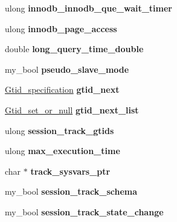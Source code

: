 \begin{DoxyCompactItemize}
ulong {\bfseries innodb\+\_\+innodb\+\_\+que\+\_\+wait\+\_\+timer}
\item 
\mbox{\label{structsystem__variables_acfb8ca70ec7a33d5a16a046352e88d9c}} 
ulong {\bfseries innodb\+\_\+page\+\_\+access}
\item 
\mbox{\label{structsystem__variables_a4bb6e4a7a5c246734dd67d04120ad000}} 
double {\bfseries long\+\_\+query\+\_\+time\+\_\+double}
\item 
\mbox{\label{structsystem__variables_a91daacd61c8a1ed9bed34a5027617157}} 
my\+\_\+bool {\bfseries pseudo\+\_\+slave\+\_\+mode}
\item 
\mbox{\label{structsystem__variables_a01851766aa96491946153ecd06eb7519}} 
\mbox{\hyperlink{structGtid__specification}{Gtid\+\_\+specification}} {\bfseries gtid\+\_\+next}
\item 
\mbox{\label{structsystem__variables_a610745f76fcd2fd2a2e0c170b73a136d}} 
\mbox{\hyperlink{structGtid__set__or__null}{Gtid\+\_\+set\+\_\+or\+\_\+null}} {\bfseries gtid\+\_\+next\+\_\+list}
\item 
\mbox{\label{structsystem__variables_a76cef237cfcd4a249f41108d70911aa1}} 
ulong {\bfseries session\+\_\+track\+\_\+gtids}
\item 
\mbox{\label{structsystem__variables_a1213f04e085d97ce09e3f217f9c52278}} 
ulong {\bfseries max\+\_\+execution\+\_\+time}
\item 
\mbox{\label{structsystem__variables_a6e9d9bed59f6f6a5e5ac1fb64efa887e}} 
char $\ast$ {\bfseries track\+\_\+sysvars\+\_\+ptr}
\item 
\mbox{\label{structsystem__variables_addefc3ca648422096942e975bbbc7612}} 
my\+\_\+bool {\bfseries session\+\_\+track\+\_\+schema}
\item 
\mbox{\label{structsystem__variables_a35a21332cab968d3ef9fa3b7afc467e9}} 
my\+\_\+bool {\bfseries session\+\_\+track\+\_\+state\+\_\+change}

\end{DoxyCompactItemize}
